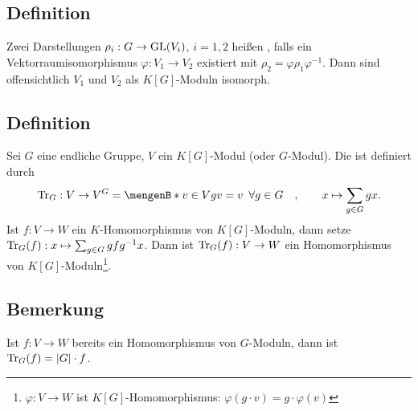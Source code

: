 \subsection[Definition: Äquivalenz von Darstellungen]{Definition} %
\label{sub:43}
Zwei Darstellungen $\rho_i : G \to \GL(V_i)$, $i=1,2$ heißen , falls ein Vektorraumisomorphismus $\varphi : V_1 \to V_2$ existiert mit 
$\rho_2 = \varphi \rho_1 \varphi ^{-1}$. Dann sind offensichtlich $V_1$ und $V_2$ als $K[G]$-Moduln isomorph. 

\subsection[Definition: Spurabbildung]{Definition} %
\label{sub:44}
Sei $G$ eine endliche Gruppe, $V$ ein $K[G]$-Modul (oder $G$-Modul). Die  ist definiert durch 
\[
	\Tr_G : V \to V^G = \set[v \in V]{g v = v \enspace\forall g \in G}  \quad , \qquad  x \mapsto \sum_{g \in G} g x.
\]
Ist $f : V \to W$ ein $K$-Homomorphismus von $K[G]$-Moduln, dann setze $\Tr_G(f) : x \mapsto \sum_{g \in G} g f g ^{-1} x$. Dann ist $\Tr_G(f): V \to W$ ein Homomorphismus
von $K[G]$-Moduln\footnote{$\varphi : V \to W$ ist $K[G]$-Homomorphismus: $\varphi(g \cdot v) = g \cdot \varphi(v)$}.

\subsection{Bemerkung} %
\label{sub:45}
Ist $f : V \to W$ bereits ein Homomorphismus von $G$-Moduln, dann ist $\Tr_G(f)= \abs*{G} \cdot f$.

